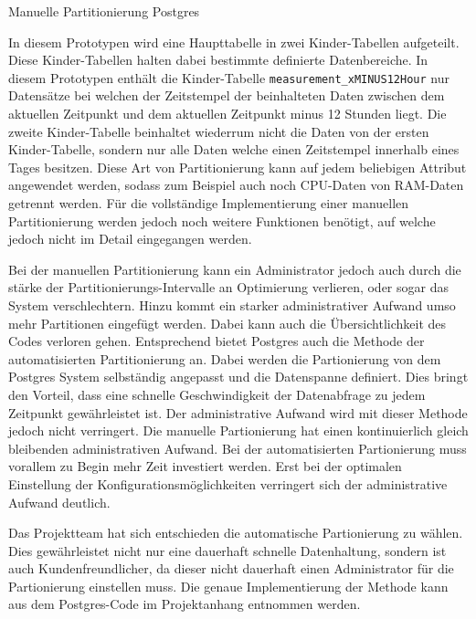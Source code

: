 \begin{listing}
  \inputminted{sql}{../listings/postgres-part-sample.txt}
  \caption{Manuelle Partitionierung Postgres}
\end{listing}

In diesem Prototypen wird eine Haupttabelle in zwei Kinder-Tabellen aufgeteilt.
Diese Kinder-Tabellen halten dabei bestimmte definierte Datenbereiche. In
diesem Prototypen enthält die Kinder-Tabelle \texttt{measurement_xMINUS12Hour}
nur Datensätze bei welchen der Zeitstempel der beinhalteten Daten zwischen dem
aktuellen Zeitpunkt und dem aktuellen Zeitpunkt minus 12 Stunden liegt. Die
zweite Kinder-Tabelle beinhaltet wiederrum nicht die Daten von der ersten
Kinder-Tabelle, sondern nur alle Daten welche einen Zeitstempel innerhalb
eines Tages besitzen. Diese Art von Partitionierung kann auf jedem beliebigen
Attribut angewendet werden, sodass zum Beispiel auch noch CPU-Daten von
RAM-Daten getrennt werden. Für die vollständige Implementierung einer manuellen
Partitionierung werden jedoch noch weitere Funktionen benötigt, auf welche
jedoch nicht im Detail eingegangen werden.

Bei der manuellen Partitionierung kann ein Administrator jedoch auch durch die
stärke der Partitionierungs-Intervalle an Optimierung verlieren, oder sogar das
System verschlechtern. Hinzu kommt ein starker administrativer Aufwand umso
mehr Partitionen eingefügt werden. Dabei kann auch die Übersichtlichkeit des
Codes verloren gehen. Entsprechend bietet Postgres auch die Methode der
automatisierten Partitionierung an. Dabei werden die Partionierung von dem
Postgres System selbständig angepasst und die Datenspanne definiert. Dies
bringt den Vorteil, dass eine schnelle Geschwindigkeit der Datenabfrage zu
jedem Zeitpunkt gewährleistet ist. Der administrative Aufwand wird mit dieser
Methode jedoch nicht verringert. Die manuelle Partionierung hat einen
kontinuierlich gleich bleibenden administrativen Aufwand. Bei der
automatisierten Partionierung muss vorallem zu Begin mehr Zeit investiert
werden. Erst bei der optimalen Einstellung der Konfigurationsmöglichkeiten
verringert sich der administrative Aufwand deutlich. 

Das Projektteam hat sich entschieden die automatische Partionierung zu wählen.
Dies gewährleistet nicht nur eine dauerhaft schnelle Datenhaltung, sondern ist
auch Kundenfreundlicher, da dieser nicht dauerhaft einen Administrator für
die Partionierung einstellen muss. Die genaue Implementierung der Methode
kann aus dem Postgres-Code im Projektanhang entnommen werden.
\nl%

